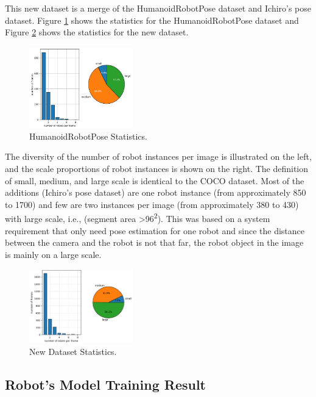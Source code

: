 This new dataset is a merge of the HumanoidRobotPose dataset and Ichiro's pose dataset. Figure \ref{fig:nimbro-statistics} shows the statistics for the HumanoidRobotPose dataset and Figure \ref{fig:new-dataset-statistics} shows the statistics for the new dataset.
\begin{figure}[ht]
  \centering
  \includegraphics[width=0.4\textwidth]{gambar/old_dataset.png}
  \caption{HumanoidRobotPose Statistics.}
  \label{fig:nimbro-statistics}
\end{figure}
The diversity of the number of robot instances per image is illustrated on the left, and the scale proportions of robot instances is shown on the right. The definition of small, medium, and large scale is identical to the COCO dataset.
Most of the additions (Ichiro's pose dataset) are one robot instance (from approximately 850 to 1700) and few are two instances per image (from approximately 380 to 430) with large scale, i.e., (segment area \textgreater 96\textsuperscript{2}). 
This was based on a system requirement that only need pose estimation for one robot and since the distance between the camera and the robot is not that far, the robot object in the image is mainly on a large scale.
\begin{figure}[ht]
  \centering
  \includegraphics[width=0.4\textwidth]{gambar/new_dataset.png}
  \caption{New Dataset Statistics.}
  \label{fig:new-dataset-statistics}
\end{figure}


\subsection{Robot's Model Training Result}
\label{subsec:robotmodeltrainingresult}

